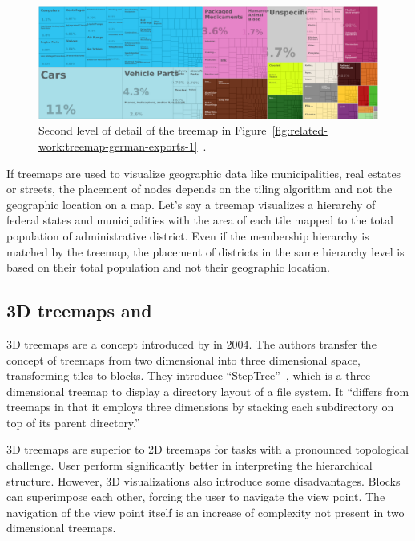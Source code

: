 \begin{figure}[ht]
    \centering
    \includegraphics[width=\textwidth]{figures/related-work/en_profile_country_deu_2}
    \caption{Second level of detail of the treemap in Figure~\ref{fig:related-work:treemap-german-exports-1}~\parencite{Observatory2017}.}
    \label{fig:related-work:treemap-german-exports-2}
\end{figure}

If treemaps are used to visualize geographic data like municipalities, real estates or streets, the placement of nodes depends on the tiling algorithm and not the geographic location on a map.
Let's say a treemap visualizes a hierarchy of federal states and municipalities with the area of each tile mapped to the total population of administrative district.
Even if the membership hierarchy is matched by the treemap, the placement of districts in the same hierarchy level is based on their total population and not their geographic location.

\subsection{3D treemaps and \tmaps{}}
3D treemaps are a concept introduced by \textcite{Bladh2004} in 2004.
The authors transfer the concept of treemaps from two dimensional into three dimensional space, transforming tiles to blocks.
They introduce ``StepTree''~\parencite{Bladh2004}, which is a three dimensional treemap to display a directory layout of a file system.
It ``differs from treemaps in that it employs three dimensions by stacking each subdirectory on top of its parent directory.''

3D treemaps are superior to 2D treemaps for tasks with a pronounced topological challenge.
User perform significantly better in interpreting the hierarchical structure.
However, 3D visualizations also introduce some disadvantages.
Blocks can superimpose each other, forcing the user to navigate the view point.
The navigation of the view point itself is an increase of complexity not present in two dimensional treemaps.

